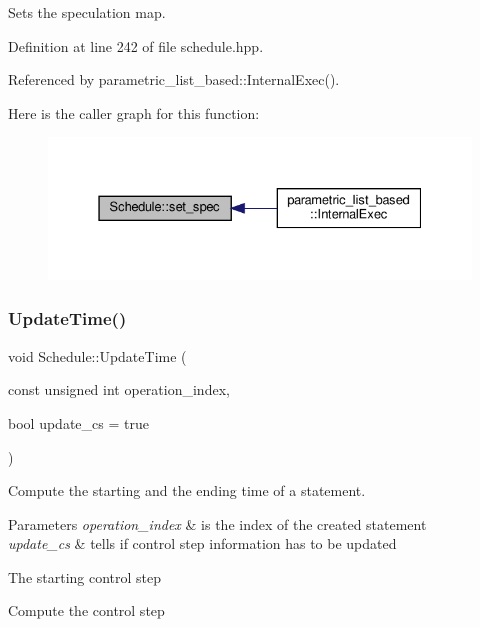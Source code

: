 Sets the speculation map. 



Definition at line 242 of file schedule.\+hpp.



Referenced by parametric\+\_\+list\+\_\+based\+::\+Internal\+Exec().

Here is the caller graph for this function\+:
\nopagebreak
\begin{figure}[H]
\begin{center}
\leavevmode
\includegraphics[width=331pt]{df/d61/classSchedule_ab6c18b64a2d8e511b1aac306c439978a_icgraph}
\end{center}
\end{figure}
\mbox{\label{classSchedule_a9eb19889586ce5d16aa8ed1ea356c2ab}} 
\subsubsection{\texorpdfstring{Update\+Time()}{UpdateTime()}}
{\footnotesize\ttfamily void Schedule\+::\+Update\+Time (\begin{DoxyParamCaption}\item[{const unsigned int}]{operation\+\_\+index,  }\item[{bool}]{update\+\_\+cs = {\ttfamily true} }\end{DoxyParamCaption})}



Compute the starting and the ending time of a statement. 


\begin{DoxyParams}{Parameters}
{\em operation\+\_\+index} & is the index of the created statement \\
\hline
{\em update\+\_\+cs} & tells if control step information has to be updated \\
\hline
\end{DoxyParams}
The starting control step

Compute the control step

